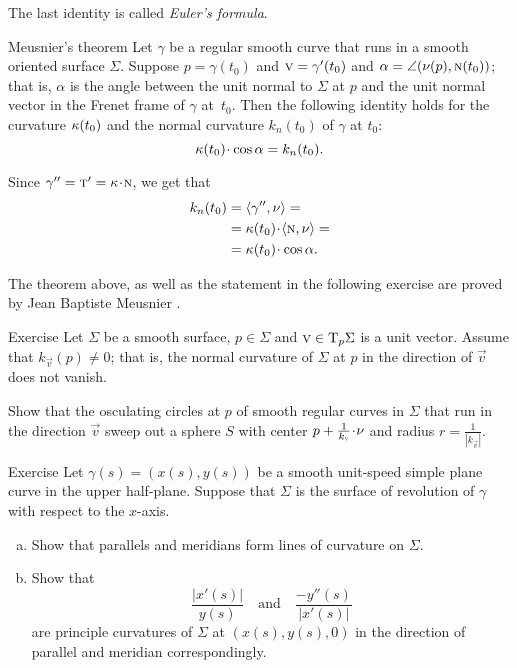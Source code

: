 The last identity is called \emph{Euler's formula}.


\begin{thm}{Meusnier's theorem}\label{thm:meusnier}
Let $\gamma$ be a regular smooth curve that runs in a smooth oriented surface $\Sigma$.
Suppose $p=\gamma(t_0)$ and ${\vec v}\z=\gamma'(t_0)$ and $\alpha=\angle(\nu(p),\textsc{n}(t_0))$;
that is, $\alpha$ is the angle between the unit normal to $\Sigma$ at $p$ and the unit normal vector in the Frenet frame of $\gamma$ at~$t_0$.
Then the following identity holds for the curvature $\kappa(t_0)$ and the normal curvature $k_n(t_0)$ of $\gamma$ at $t_0$:  
\[\kur(t_0)\cdot\cos\alpha=k_{n}(t_0).\]

\end{thm}


 Since $\gamma''=\tan'=\kur\cdot \norm$, we get that
\begin{align*}
k_{n}(t_0)&=\langle\gamma'',\Norm\rangle=
\\
&=\kur(t_0)\cdot\langle\norm,\Norm\rangle=
\\
&=\kur(t_0)\cdot\cos\alpha.
\end{align*}
\qedsf

The theorem above, as well as the statement in the following exercise are proved by Jean Baptiste Meusnier \cite{meusnier}.

\begin{thm}{Exercise}\label{ex:meusnier}
Let $\Sigma$ be a smooth surface, $p\in\Sigma$ and ${\textsc v}\in \mathrm{T}_p\Sigma$ is a unit vector.
Assume that $k_{\vec v}(p)\ne 0$; that is, the normal curvature of $\Sigma$ at $p$ in the direction of ${\vec v}$ does not vanish.

Show that the osculating circles at $p$ of smooth regular curves in $\Sigma$ that run in the direction ${\vec v}$ sweep out a sphere $S$ with center $p+\tfrac1{k_{\vec v}}\cdot\Norm$ and radius $r=\tfrac1{|k_{\vec v}|}$.
\end{thm}

\begin{thm}{Exercise}\label{ex:principle-revolution}
Let $\gamma(s)=(x(s),y(s))$ be a smooth unit-speed simple plane curve in the upper half-plane.
Suppose that $\Sigma$ is the surface of revolution of $\gamma$ with respect to the $x$-axis.

\begin{enumerate}[(a)]
\item Show that parallels and meridians form lines of curvature on $\Sigma$.
\item Show that 
\[\frac{|x'(s)|}{y(s)}
\quad
\text{and}
\quad
\frac{-y''(s)}{|x'(s)|}
\]
are principle curvatures of $\Sigma$ at $(x(s),y(s),0)$ in the direction of parallel and meridian correspondingly.
\end{enumerate}

\end{thm}

